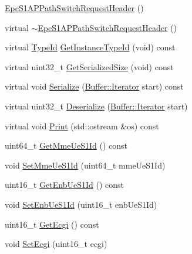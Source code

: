 \begin{DoxyCompactItemize}
\item 
\hyperlink{classns3_1_1EpcS1APPathSwitchRequestHeader_af5fefd71f742a85aad2c221ee79999ed}{Epc\+S1\+A\+P\+Path\+Switch\+Request\+Header} ()
\item 
virtual \hyperlink{classns3_1_1EpcS1APPathSwitchRequestHeader_aadd7299926afd6ceece9b92583974ef8}{$\sim$\+Epc\+S1\+A\+P\+Path\+Switch\+Request\+Header} ()
\item 
virtual \hyperlink{classns3_1_1TypeId}{Type\+Id} \hyperlink{classns3_1_1EpcS1APPathSwitchRequestHeader_add7de2703ccb083f30e5421afd99274d}{Get\+Instance\+Type\+Id} (void) const 
\item 
virtual uint32\+\_\+t \hyperlink{classns3_1_1EpcS1APPathSwitchRequestHeader_a0a1fe599f226989eaf933c732ef9eb0e}{Get\+Serialized\+Size} (void) const 
\item 
virtual void \hyperlink{classns3_1_1EpcS1APPathSwitchRequestHeader_a5b385465a20504fb417b0b6fcba673bc}{Serialize} (\hyperlink{classns3_1_1Buffer_1_1Iterator}{Buffer\+::\+Iterator} start) const 
\item 
virtual uint32\+\_\+t \hyperlink{classns3_1_1EpcS1APPathSwitchRequestHeader_a700df028f1953037b8243c2d9e6ba604}{Deserialize} (\hyperlink{classns3_1_1Buffer_1_1Iterator}{Buffer\+::\+Iterator} start)
\item 
virtual void \hyperlink{classns3_1_1EpcS1APPathSwitchRequestHeader_ad190769fba6ce3eef04af4a83936f913}{Print} (std\+::ostream \&os) const 
\item 
uint64\+\_\+t \hyperlink{classns3_1_1EpcS1APPathSwitchRequestHeader_ab00d318cb29c19c94ed2bcce7cf20ce0}{Get\+Mme\+Ue\+S1\+Id} () const 
\item 
void \hyperlink{classns3_1_1EpcS1APPathSwitchRequestHeader_ab0c071f41182f61d43e936d4f0ad33c9}{Set\+Mme\+Ue\+S1\+Id} (uint64\+\_\+t mme\+Ue\+S1\+Id)
\item 
uint16\+\_\+t \hyperlink{classns3_1_1EpcS1APPathSwitchRequestHeader_a4898c9466645345e667c508fb8b5165c}{Get\+Enb\+Ue\+S1\+Id} () const 
\item 
void \hyperlink{classns3_1_1EpcS1APPathSwitchRequestHeader_affc828c9eea2d8665e15dd2ad543dc31}{Set\+Enb\+Ue\+S1\+Id} (uint16\+\_\+t enb\+Ue\+S1\+Id)
\item 
uint16\+\_\+t \hyperlink{classns3_1_1EpcS1APPathSwitchRequestHeader_af05a6062cf9fbfb0aaea0f4b248fce33}{Get\+Ecgi} () const 
\item 
void \hyperlink{classns3_1_1EpcS1APPathSwitchRequestHeader_ac0e302299d984353a4b51d22658582a1}{Set\+Ecgi} (uint16\+\_\+t ecgi)

\end{DoxyCompactItemize}

